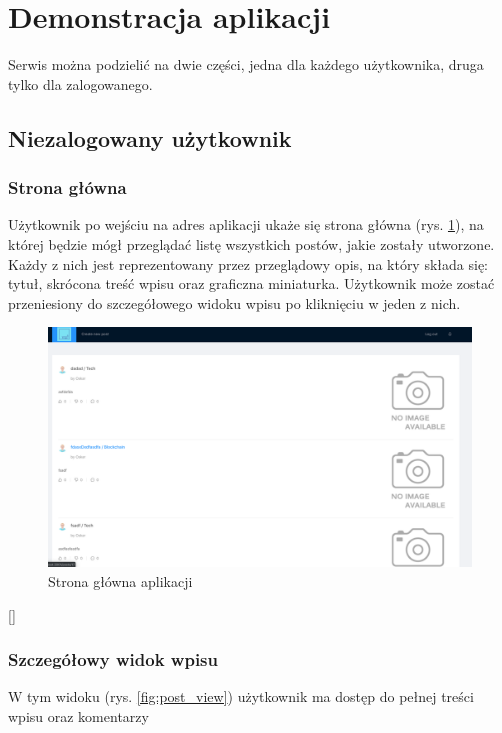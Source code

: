 \documentclass[declaration,shortabstract]{iithesis}
\begin{document}
\section{Demonstracja aplikacji}
Serwis można podzielić na dwie części, jedna dla każdego użytkownika, druga tylko dla zalogowanego.

\subsection{Niezalogowany użytkownik}
\subsubsection{Strona główna}
Użytkownik po wejściu na adres aplikacji ukaże się strona główna (rys. \ref{fig:main_page}), na której będzie mógł przeglądać listę wszystkich postów, jakie zostały utworzone. Każdy z nich jest reprezentowany przez przeglądowy opis, na który składa się: tytuł, skrócona treść wpisu oraz graficzna miniaturka. Użytkownik może zostać przeniesiony do szczegółowego widoku wpisu po kliknięciu w jeden z nich.
\begin{figure}
    \centering
    \includegraphics[width=\textwidth]{images/stronaglowna.png}
    \caption{Strona główna aplikacji}
    \label{fig:main_page}
\end{figure}[]

\subsubsection{Szczegółowy widok wpisu}
W tym widoku (rys. \ref{fig:post_view}) użytkownik ma dostęp do pełnej treści wpisu oraz komentarzy
\end{document}
